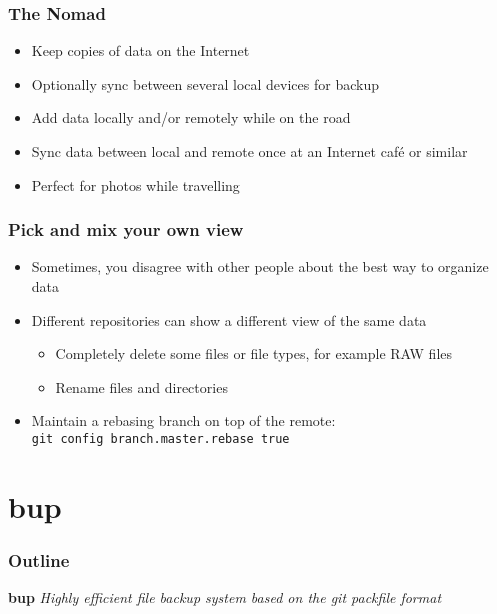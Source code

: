\documentclass[t]{beamer}
\begin{document}
\begin{frame}
	\frametitle{The Nomad}
	\begin{itemize}
		\item Keep copies of data on the Internet
		\item Optionally sync between several local devices for backup
		\item Add data locally and/or remotely while on the road
		\item Sync data between local and remote once at an Internet café or similar
		\item Perfect for photos while travelling
	\end{itemize}
\end{frame}

\begin{frame}
	\frametitle{Pick and mix your own view}
	\begin{itemize}
		\item Sometimes, you disagree with other people about the best way to organize data
		\item Different repositories can show a different view of the same data
			\begin{itemize}
				\item Completely delete some files or file types, for example RAW files
				\item Rename files and directories
			\end{itemize}
		\item Maintain a rebasing branch on top of the remote: \\
		\texttt{git config branch.master.rebase true}
	\end{itemize}
\end{frame}


\section{bup}

\begin{frame}
	\frametitle{Outline}
	\tableofcontents[currentsection]
\end{frame}

\begin{frame}
		\begin{center}
			\vfill
			\vfill
			\textbf{bup}
			\vfill
			\textit{Highly efficient file backup system based on the git packfile format}
			\vfill
			\vfill
		\end{center}
\end{frame}
\end{document}
